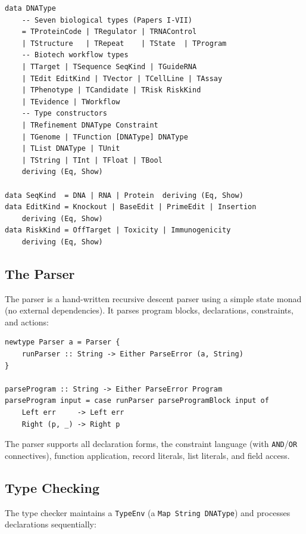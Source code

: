 \documentclass[12pt,a4paper]{article}
\begin{document}
\begin{lstlisting}[style=haskellstyle,caption={Core type representation in Haskell.},label={lst:types}]
data DNAType
    -- Seven biological types (Papers I-VII)
    = TProteinCode | TRegulator | TRNAControl
    | TStructure   | TRepeat    | TState  | TProgram
    -- Biotech workflow types
    | TTarget | TSequence SeqKind | TGuideRNA
    | TEdit EditKind | TVector | TCellLine | TAssay
    | TPhenotype | TCandidate | TRisk RiskKind
    | TEvidence | TWorkflow
    -- Type constructors
    | TRefinement DNAType Constraint
    | TGenome | TFunction [DNAType] DNAType
    | TList DNAType | TUnit
    | TString | TInt | TFloat | TBool
    deriving (Eq, Show)

data SeqKind  = DNA | RNA | Protein  deriving (Eq, Show)
data EditKind = Knockout | BaseEdit | PrimeEdit | Insertion
    deriving (Eq, Show)
data RiskKind = OffTarget | Toxicity | Immunogenicity
    deriving (Eq, Show)
\end{lstlisting}

\subsection{The Parser}

The parser is a hand-written recursive descent parser using a simple state monad (no external dependencies). It parses program blocks, declarations, constraints, and actions:

\begin{lstlisting}[style=haskellstyle,caption={Parser monad and entry point.},label={lst:parser}]
newtype Parser a = Parser {
    runParser :: String -> Either ParseError (a, String)
}

parseProgram :: String -> Either ParseError Program
parseProgram input = case runParser parseProgramBlock input of
    Left err     -> Left err
    Right (p, _) -> Right p
\end{lstlisting}

The parser supports all declaration forms, the constraint language (with \texttt{AND}/\texttt{OR} connectives), function application, record literals, list literals, and field access.

\subsection{Type Checking}

The type checker maintains a \texttt{TypeEnv} (a \texttt{Map String DNAType}) and processes declarations sequentially:
\end{document}
